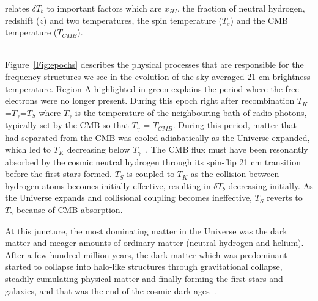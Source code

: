 	relates $\delta$$T_b$ to important factors which are \(x_{HI}\), the fraction of neutral hydrogen, redshift ($z$) and two temperatures, the spin temperature ($T_s$) and the CMB temperature ($T_{CMB}$).
	
	 \\
	
	Figure~\ref{Fig:epochs} describes the physical processes that are responsible for the frequency structures we see in the evolution of the sky-averaged 21 cm brightness temperature. Region A highlighted in green explains the period where the free electrons were no longer present. During this epoch right after recombination $T_K$=$T_\gamma$=$T_S$ where $T_\gamma$ is the temperature of the neighbouring bath of radio photons, typically set by the CMB so that $T_\gamma$ = $T_{CMB}$. During this period, matter that had separated from the CMB was cooled adiabatically as the Universe expanded, which led to $T_K$ decreasing below $T_\gamma$~\citep{2006PhR...433..181F}. The CMB flux must have been resonantly absorbed by the cosmic neutral hydrogen through its spin-flip 21 cm transition before the first stars formed. $T_S$ is coupled to $T_K$ as the collision between hydrogen atoms becomes initially effective, resulting in $\delta T_b$ decreasing initially. As the Universe expands and collisional coupling becomes ineffective, $T_S$ reverts to $T_\gamma$ because of CMB absorption.
	
	At this juncture, the most dominating matter in the Universe was the dark matter and meager amounts of ordinary matter (neutral hydrogen and helium). After a few hundred million years, the dark matter which was predominant started to collapse into halo-like structures through gravitational collapse, steadily cumulating physical matter and finally forming the first stars and galaxies, and that was the end of the cosmic dark ages~\citep{2003Sci...300.1904M}.
	
	

